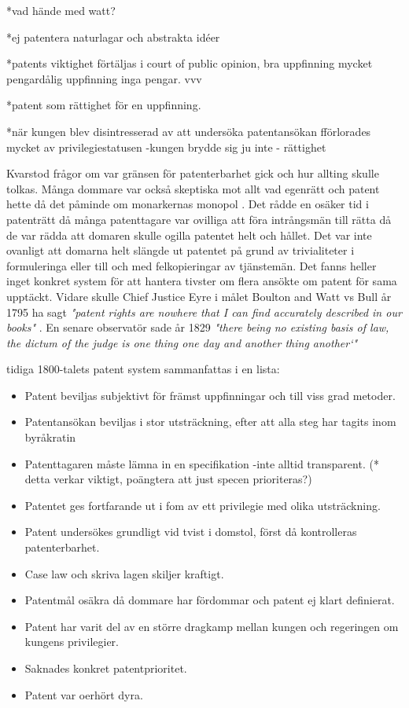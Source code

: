 *vad hände med watt?

*ej patentera naturlagar och abstrakta idéer 

*patents viktighet förtäljas i court of public opinion, bra uppfinning mycket pengardålig uppfinning inga pengar. vvv

*patent som rättighet för en uppfinning.

*när kungen blev disintresserad av att undersöka patentansökan fförlorades mycket av privilegiestatusen -kungen brydde sig ju inte - rättighet


Kvarstod frågor om var gränsen för patenterbarhet gick och hur allting skulle tolkas\cite{bracha}. Många dommare var också skeptiska mot allt vad egenrätt och patent hette då det påminde om monarkernas monopol \cite{macleod}.
Det rådde en osäker tid i patenträtt då många patenttagare var ovilliga att föra intrångsmän till
rätta då de var rädda att domaren skulle ogilla patentet helt och hållet. Det var inte ovanligt att
domarna helt slängde ut patentet på grund av trivialiteter i formuleringa eller till och med
felkopieringar av tjänstemän\cite{macleod}. Det fanns heller inget konkret system för att hantera tivster om flera ansökte om patent för sama upptäckt\cite{bracha, webster}. Vidare skulle Chief Justice Eyre i målet Boulton and Watt vs Bull år 1795 ha sagt \emph{"patent rights are nowhere that I can find accurately described in our books"} \cite{macleod}. En senare observatör sade år 1829 \emph{"there being no existing basis of law, the dictum of the judge is 
one thing one day and another thing another‘"} \cite{macleod}

tidiga 1800-talets patent system sammanfattas i en lista:

\begin{itemize}
	\item Patent beviljas subjektivt för främst uppfinningar och till viss grad metoder.
	\item Patentansökan beviljas i stor utsträckning, efter att alla steg har tagits inom byråkratin
	\item Patenttagaren måste lämna in en specifikation -inte alltid transparent. (* detta verkar viktigt, poängtera att just specen prioriteras?)
	\item Patentet ges fortfarande ut i fom av ett privilegie med olika utsträckning.
	\item Patent undersökes grundligt vid tvist i domstol, först då kontrolleras patenterbarhet.
	\item Case law och skriva lagen skiljer kraftigt.
	\item Patentmål osäkra då dommare har fördommar och patent ej klart definierat.
	\item Patent har varit del av en större dragkamp mellan kungen och regeringen om kungens privilegier. 
	\item Saknades konkret patentprioritet.
	\item Patent var oerhört dyra.
\end{itemize}

